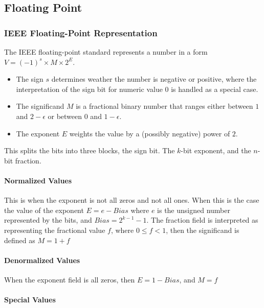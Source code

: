 \documentclass[10pt]{armath}
\begin{document}
\subsection{Floating Point}%
\label{sub:floating_point}

\subsubsection{IEEE Floating-Point Representation}%
\label{ssub:ieee_floating_point_representation}

The IEEE floating-point standard represents a number in a form $V=(-1)^s\times
M\times 2^E$.
\begin{itemize}
  \item The sign $s$ determines weather the number is negative or positive,
    where the interpretation of the sign bit for numeric value $0$ is handled
    as a special case.
  \item The significand $M$ is a fractional binary number that ranges either
    between $1$ and $2-\epsilon$ or between $0$ and $1-\epsilon$.
  \item The exponent $E$ weights the value by a (possibly negative) power of
    $2$.
\end{itemize}

This splits the bits into three blocks, the sign bit. The $k$-bit exponent, and
the $n$-bit fraction.

\paragraph{Normalized Values}%
\label{par:normalized_values}

This is when the exponent is not all zeros and not all ones. When this is the
case the value of the exponent $E=e-Bias$ where $e$ is the unsigned number
represented by the bits, and $Bias=2^{k-1}-1$. The fraction field is
interpreted as representing the fractional value $f$, where $0\leq f<1$, then
the significand is defined as $M=1+f$

\paragraph{Denormalized Values}%
\label{par:denormalized_values}

When the exponent field is all zeros, then $E=1-Bias$, and $M=f$

\paragraph{Special Values}%
\label{par:special_values}
\end{document}
